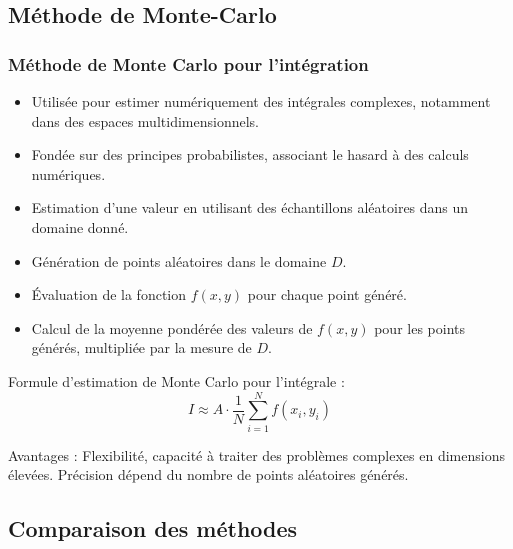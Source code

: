 \documentclass[10pt]{beamer}
\begin{document}
\subsection{Méthode de Monte-Carlo}
\begin{frame}
    \frametitle{Méthode de Monte Carlo pour l'intégration}
    \small
    \begin{itemize}
        \item Utilisée pour estimer numériquement des intégrales complexes, notamment dans des espaces multidimensionnels.
        
        \item Fondée sur des principes probabilistes, associant le hasard à des calculs numériques.
        
        \item Estimation d'une valeur en utilisant des échantillons aléatoires dans un domaine donné.
        
        \item Génération de points aléatoires dans le domaine $D$.
        
        \item Évaluation de la fonction $f(x, y)$ pour chaque point généré.
        
        \item Calcul de la moyenne pondérée des valeurs de $f(x, y)$ pour les points générés, multipliée par la mesure de $D$.
    \end{itemize}

    Formule d'estimation de Monte Carlo pour l'intégrale :
    $$I \approx A \cdot \frac{1}{N} \sum_{i=1}^{N} f(x_i, y_i)$$

    Avantages : Flexibilité, capacité à traiter des problèmes complexes en dimensions élevées. Précision dépend du nombre de points aléatoires générés.

\end{frame}

\subsection{Comparaison des méthodes}
\end{document}
